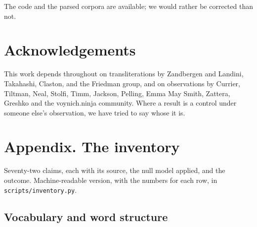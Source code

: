 \documentclass[11pt,a4paper]{article}
\begin{document}
The code and the parsed corpora are available; we would rather be corrected than not.

\section*{Acknowledgements}


This work depends throughout on transliterations by Zandbergen and Landini, Takahashi, Claston, and the Friedman group, and on observations by Currier, Tiltman, Neal, Stolfi, Timm, Jackson, Pelling, Emma May Smith, Zattera, Greshko and the voynich.ninja community. Where a result is a control under someone else's observation, we have tried to say whose it is.

\section*{Appendix. The inventory}


Seventy-two claims, each with its source, the null model applied, and the outcome. Machine-readable version, with the numbers for each row, in \texttt{scripts/inventory.py}.

\subsection*{Vocabulary and word structure}
\end{document}
